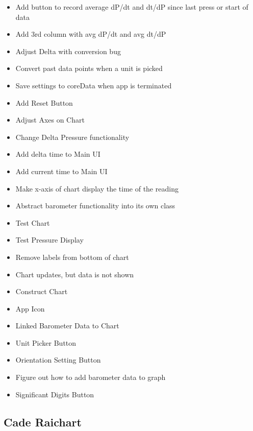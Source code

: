 \documentclass[onecolumn, draftclsnofoot,10pt, compsoc]{IEEEtran}
\begin{document}
\begin{itemize}
    \item Add button to record average dP/dt and dt/dP since last press or start of data
    \item Add 3rd column with avg dP/dt and avg dt/dP
    \item Adjust Delta with conversion bug
    \item Convert past data points when a unit is picked
    \item Save settings to coreData when app is terminated
    \item Add Reset Button
    \item Adjust Axes on Chart
    \item Change Delta Pressure functionality
    \item Add delta time to Main UI
    \item Add current time to Main UI
    \item Make x-axis of chart display the time of the reading
    \item Abstract barometer functionality into its own class
    \item Test Chart
    \item Test Pressure Display
    \item Remove labels from bottom of chart
    \item Chart updates, but data is not shown
    \item Construct Chart
    \item App Icon
    \item Linked Barometer Data to Chart
    \item Unit Picker Button
    \item Orientation Setting Button
    \item Figure out how to add barometer data to graph
    \item Significant Digits Button
\end{itemize}
\subsection{Cade Raichart}
\end{document}
